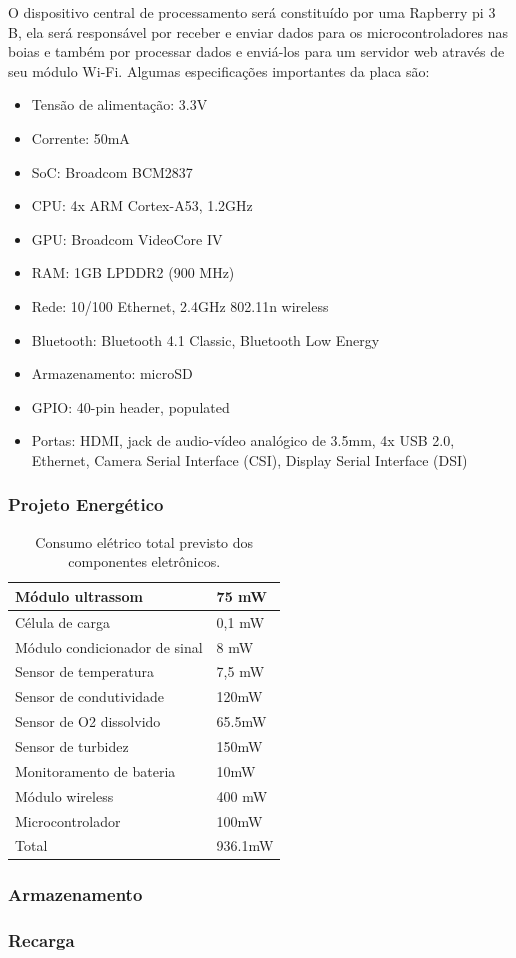 O dispositivo central de processamento será constituído por uma Rapberry pi 3 B, ela será responsável por receber e enviar dados para os microcontroladores nas boias e também por processar dados e enviá-los para um servidor web através de seu módulo Wi-Fi. Algumas especificações importantes da placa são:
\begin{itemize}
\item Tensão de alimentação: 3.3V
\item Corrente: 50mA
\item SoC: Broadcom BCM2837
\item CPU: 4x ARM Cortex-A53, 1.2GHz
\item GPU: Broadcom VideoCore IV
\item RAM: 1GB LPDDR2 (900 MHz)
\item Rede: 10/100 Ethernet, 2.4GHz 802.11n wireless
\item Bluetooth: Bluetooth 4.1 Classic, Bluetooth Low Energy
\item Armazenamento: microSD
\item GPIO: 40-pin header, populated
\item Portas: HDMI, jack de audio-vídeo analógico de 3.5mm, 4x USB 2.0, Ethernet, Camera Serial Interface (CSI), Display Serial Interface (DSI)
\end{itemize}

\subsubsection{Projeto Energético}

\begin{table}[H]
\centering
\caption{Consumo elétrico total previsto dos componentes eletrônicos.}
\label{tabela_eletronica_energia}
\begin{tabular}{|l|l|}
\hline
Módulo ultrassom              & 75 mW   \\ \hline
Célula de carga               & 0,1 mW  \\ \hline
Módulo condicionador de sinal & 8 mW    \\ \hline
Sensor de temperatura         & 7,5 mW  \\ \hline
Sensor de condutividade       & 120mW   \\ \hline
Sensor de O2 dissolvido       & 65.5mW  \\ \hline
Sensor de turbidez            & 150mW   \\ \hline
Monitoramento de bateria      & 10mW    \\ \hline
Módulo wireless               & 400 mW  \\ \hline
Microcontrolador              & 100mW   \\ \hline
Total                         & 936.1mW \\ \hline
\end{tabular}
\end{table}

\subsubsection{Armazenamento}
\subsubsection{Recarga}
